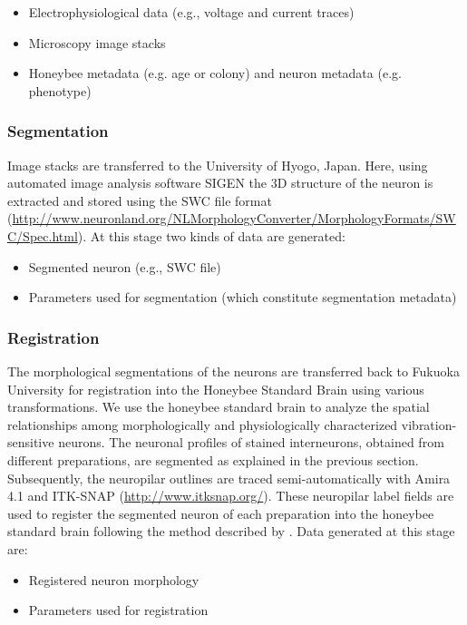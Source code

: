 \documentclass{frontiersSCNS} %
\begin{document}
\begin{itemize}
\item Electrophysiological data (e.g., voltage and current traces)
\item Microscopy image stacks
\item Honeybee metadata (e.g. age or colony) and neuron metadata (e.g.
    phenotype)
\end{itemize}

\subsubsection{Segmentation}

Image stacks are transferred to the University of Hyogo, Japan. Here, using
automated image analysis software SIGEN \citep{Yamasaki2006, Minemoto} the 3D
structure of the neuron is extracted and stored using the SWC file format
(\url{http://www.neuronland.org/NLMorphologyConverter/MorphologyFormats/SWC/Spec.html}).
At this stage two kinds of data are generated:

\begin{itemize}
    \item Segmented neuron (e.g., SWC file)
\item Parameters used for segmentation (which constitute segmentation metadata)
\end{itemize}


\subsubsection{Registration}

The morphological segmentations of the neurons are transferred back to Fukuoka
University for registration into the Honeybee Standard Brain using various
transformations. We use the honeybee standard brain to analyze the spatial
relationships among morphologically and physiologically characterized
vibration-sensitive neurons. The neuronal profiles of stained interneurons,
obtained from different preparations, are segmented as explained in the
previous section. Subsequently, the neuropilar outlines are traced
semi-automatically with Amira 4.1 \citep{Evers2005} and ITK-SNAP
(\url{http://www.itksnap.org/}).  These neuropilar label fields are used to
register the segmented neuron of each preparation into the honeybee standard
brain following the method described by \citet{Brandt2005}. Data generated at
this stage are:

\begin{itemize}
\item Registered neuron morphology
\item Parameters used for registration
\end{itemize}
\end{document}
